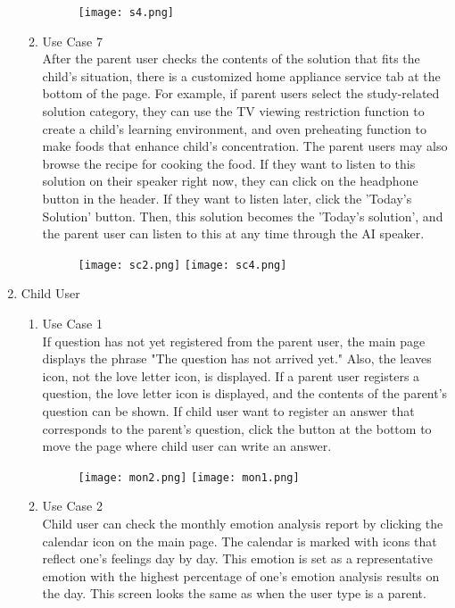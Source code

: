 \documentclass[conference]{IEEEtran}
\begin{document}
\begin{enumerate}
\begin{enumerate}
\begin{figure}[H]
        \texttt{[image: s4.png]}
        \end{figure}
        \item Use Case 7
        \\After the parent user checks the contents of the solution that fits the child's situation, there is a customized home appliance service tab at the bottom of the page. For example, if parent users select the study-related solution category, they can use the TV viewing restriction function to create a child's learning environment, and oven preheating function to make foods that enhance child’s concentration. The parent users may also browse the recipe for cooking the food. If they want to listen to this solution on their speaker right now, they can click on the headphone button in the header. If they want to listen later, click the 'Today’s Solution' button. Then, this solution becomes the 'Today’s solution', and the parent user can listen to this at any time through the AI speaker.
        \begin{figure}[H]
        \centering
        \texttt{[image: sc2.png]}
        \texttt{[image: sc4.png]}
        \end{figure}
    \end{enumerate}
    \newpage
    \item Child User
    \begin{enumerate}
        \begin{figure}[H]
        \centering
        \texttt{[image: ch1.png]}
        \texttt{[image: ch2.png]}
        \end{figure}
        \item Use Case 1 
        \\If question has not yet registered from the parent user, the main page displays the phrase "The question has not arrived yet." Also, the leaves icon, not the love letter icon, is displayed. If a parent user registers a question, the love letter icon is displayed, and the contents of the parent's question can be shown. If child user want to register an answer that corresponds to the parent’s question, click the button at the bottom to move the page where child user can write an answer.
        \begin{figure}[H]
         \centering
         \texttt{[image: mon2.png]}
         \texttt{[image: mon1.png]}
         \end{figure}
        \item Use Case 2
        \\Child user can check the monthly emotion analysis report by clicking the calendar icon on the main page. The calendar is marked with icons that reflect one's feelings day by day. This emotion is set as a representative emotion with the highest percentage of one's emotion analysis results on the day. This screen looks the same as when the user type is a parent.

\end{enumerate}
\end{enumerate}
\end{document}
